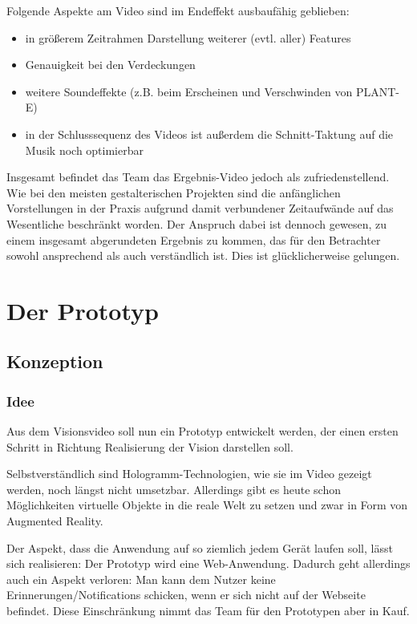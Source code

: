 Folgende Aspekte am Video sind im Endeffekt ausbaufähig geblieben:

\begin{itemize}
\tightlist
\item
  in größerem Zeitrahmen Darstellung weiterer (evtl. aller) Features
\item
  Genauigkeit bei den Verdeckungen
\item
  weitere Soundeffekte (z.B. beim Erscheinen und Verschwinden von
  PLANT-E)
\item
  in der Schlusssequenz des Videos ist außerdem die Schnitt-Taktung auf
  die Musik noch optimierbar
\end{itemize}

Insgesamt befindet das Team das Ergebnis-Video jedoch als
zufriedenstellend. Wie bei den meisten gestalterischen Projekten sind
die anfänglichen Vorstellungen in der Praxis aufgrund damit verbundener
Zeitaufwände auf das Wesentliche beschränkt worden. Der Anspruch dabei
ist dennoch gewesen, zu einem insgesamt abgerundeten Ergebnis zu kommen,
das für den Betrachter sowohl ansprechend als auch verständlich ist.
Dies ist glücklicherweise gelungen.

\hypertarget{prototyp}{%
\section{Der Prototyp}\label{prototyp}}

\hypertarget{konzeption}{%
\subsection{Konzeption}\label{konzeption}}

\hypertarget{idee}{%
\subsubsection{Idee}\label{idee}}

Aus dem Visionsvideo soll nun ein Prototyp entwickelt werden, der einen
ersten Schritt in Richtung Realisierung der Vision darstellen soll.

Selbstverständlich sind Hologramm-Technologien, wie sie im Video gezeigt
werden, noch längst nicht umsetzbar. Allerdings gibt es heute schon
Möglichkeiten virtuelle Objekte in die reale Welt zu setzen und zwar in
Form von Augmented Reality.

Der Aspekt, dass die Anwendung auf so ziemlich jedem Gerät laufen soll,
lässt sich realisieren: Der Prototyp wird eine Web-Anwendung. Dadurch
geht allerdings auch ein Aspekt verloren: Man kann dem Nutzer keine
Erinnerungen/Notifications schicken, wenn er sich nicht auf der Webseite
befindet. Diese Einschränkung nimmt das Team für den Prototypen aber in
Kauf.


